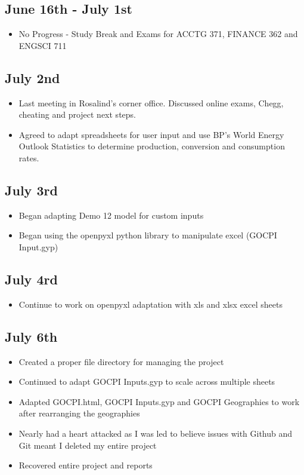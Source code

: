 \documentclass[12pt]{article}
\begin{document}
\subsection{June 16th - July 1st}
\begin{itemize}
	\item No Progress - Study Break and Exams for ACCTG 371, FINANCE 362 and ENGSCI 711
\end{itemize}
\subsection{July 2nd}
\begin{itemize}
	\item Last meeting in Rosalind's corner office. Discussed online exams, Chegg, cheating and project next steps.
	\item Agreed to adapt spreadsheets for user input and use BP's World Energy Outlook Statistics to determine production, conversion and consumption rates.
\end{itemize}
\subsection{July 3rd}
\begin{itemize}
	\item Began adapting Demo 12 model for custom inputs
	\item Began using the openpyxl python library to manipulate excel (GOCPI Input.gyp)
\end{itemize}
\subsection{July 4rd}
\begin{itemize}
	\item Continue to work on openpyxl adaptation with xls and xlsx excel sheets
\end{itemize}
\subsection{July 6th}
\begin{itemize}
	\item Created a proper file directory for managing the project
	\item Continued to adapt GOCPI Inputs.gyp to scale across multiple sheets
	\item Adapted GOCPI.html, GOCPI Inputs.gyp and GOCPI Geographies to work after rearranging the geographies
	\item Nearly had a heart attacked as I was led to believe issues with Github and Git meant I deleted my entire project
	\item Recovered entire project and reports
\end{itemize}
\end{document}
